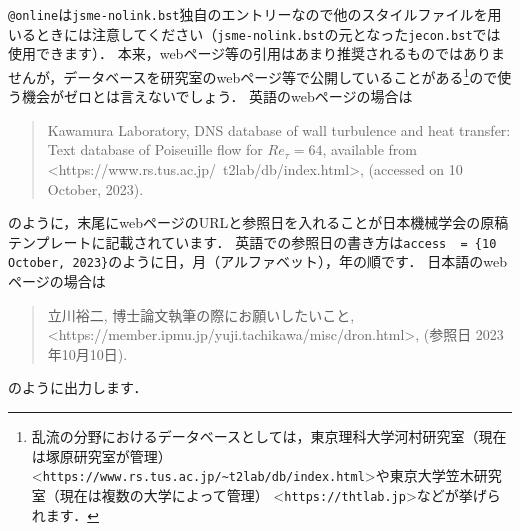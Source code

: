 \documentclass[a4paper,fleqn,uplatex,dvipdfmx]{jsarticle}
\makeatletter
\newcommand{\jsmefile}{\texttt{jsme-nolink.bst}}
\newcommand{\ttonline}{\texttt{@online}}
\makeatother
\begin{document}
\ttonline は\jsmefile 独自のエントリーなので他の\BibTeX{}スタイルファイルを用いるときには注意してください（\jsmefile の元となった\verb|jecon.bst|では使用できます）．
本来，webページ等の引用はあまり推奨されるものではありませんが，データベースを研究室のwebページ等で公開していることがある\footnote{乱流の分野におけるデータベースとしては，東京理科大学河村研究室（現在は塚原研究室が管理） \textless\verb|https://www.rs.tus.ac.jp/~t2lab/db/index.html|\textgreater や東京大学笠木研究室（現在は複数の大学によって管理） \textless\verb|https://thtlab.jp|\textgreater などが挙げられます．}ので使う機会がゼロとは言えないでしょう．
英語のwebページの場合は
\begin{quote}
    Kawamura Laboratory, DNS database of wall turbulence and heat transfer: Text database of Poiseuille flow for $\mathit{Re}_\tau = 64$, available from \textless https://www.rs.tus.ac.jp/~t2lab/db/index.html\textgreater, (accessed on 10 October, 2023).
\end{quote}
のように，末尾にwebページのURLと参照日を入れることが日本機械学会の原稿テンプレートに記載されています．
英語での参照日の書き方は\verb|access  = {10 October, 2023}|のように日，月（アルファベット），年の順です．
日本語のwebページの場合は
\begin{quote}
    立川裕二, 博士論文執筆の際にお願いしたいこと, \textless https://member.ipmu.jp/yuji.tachikawa/misc/dron.html\textgreater, (参照日 2023年10月10日).
\end{quote}
のように出力します．
\end{document}

